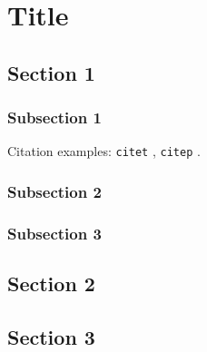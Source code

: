 \doublespacing
\allowdisplaybreaks

\chapter{Title}

\section{Section 1}
\subsection{Subsection 1}

Citation examples: \texttt{citet} \citet{tibshirani1996regression}, \texttt{citep} \citep{tibshirani1996regression}.

\subsection{Subsection 2}
\subsection{Subsection 3}
\section{Section 2}
\section{Section 3}


